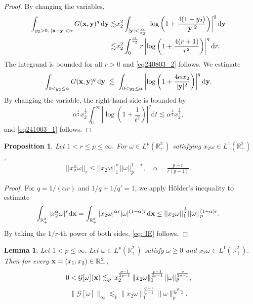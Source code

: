 \documentclass[11pt]{amsart}
\newtheorem{lemma}[theorem]{Lemma}
\newtheorem{proposition}[theorem]{Proposition}
\theoremstyle{definition}
\theoremstyle{definition}
\numberwithin{equation}{section}
\newcommand{\0}{\emptyset}
\newcommand{\bfx}{{\bf x}}
\newcommand{\bfy}{{\bf y}}
\newcommand{\calG}{\mathcal G}
\newcommand{\dd}{\mathrm{d}}
\begin{document}
	\begin{proof}
		By changing the variables,
		\begin{align*}
			\int_{y_2>0,\;|\bfx-\bfy|<\alpha} G(\bfx,\bfy)^q \,\dd\bfy
			\lesssim &x_2^2 \int_{|\bfy|<\frac{\alpha}{x_2}} \left| \log\left(1+\frac{4(1-y_2)}{|\bfy|^2}\right)\right|^q \dd\bfy \\ \lesssim &x_2^2 \int_0^{\frac{\alpha}{x_2}} r \left| \log \left(1+\frac{4(r+1)}{r^2}\right)\right|^q \dd r.
		\end{align*}
		The integrand is bounded for all $r>0$ and \eqref{eq240803_2} follows. We estimate 
		\[
		\int_{0<y_2\le\alpha} G(\bfx,\bfy)^q \,\dd\bfy 
		\;\lesssim\; \int_{0<y_2\le\alpha} \left|\log \left(1+\frac{4\alpha x_2}{|\bfy|^2}\right)\right|^q \dd\bfy.
		\]
		By changing the variable, the right-hand side is bounded by
		\[
		\alpha^{\frac{3}{2}}x_2^{\frac{1}{2}} \int_0^\infty \left|\log\!\left(1+\frac{1}{t^2}\right)\right|^q \dd t \lesssim \alpha^{\frac{3}{2}}x_2^{\frac{1}{2}},
		\]
		and \eqref{eq241003_1} follows. 
	\end{proof}
	
	
	\begin{proposition}\label{prop: IE}
		Let $1<r\leq p\leq \infty$. For $\omega\in L^{p}(\mathbb{R}^{2}_{+})$ satisfying $x_2\omega\in L^{1}(\mathbb{R}^{2}_{+})$,  
		\begin{align}
			||x_2^{\alpha}\omega||_{r}\leq ||x_2\omega||_{1}^{\alpha}||\omega||_{p}^{1-\alpha},\quad \alpha=\frac{p-r}{r(p-1)}.  \label{eq: IE}
		\end{align}
	\end{proposition}
	
	\begin{proof}
		For $q=1/(\alpha r)$ and $1/q+1/q'=1$, we apply H\"older's inequality to estimate 
		\begin{align*}
			\int_{\mathbb{R}^{2}_{+}}|x_2^{\alpha}\omega|^{r}\dd\bfx=\int_{\mathbb{R}^{2}_{+}}|x_2\omega|^{\alpha r}|\omega|^{(1-\alpha) r}\dd\bfx
			\leq ||x_2\omega||_{1}^{\frac{1}{q}}||\omega||_{p}^{(1-\alpha)r}.
		\end{align*}
		By taking the $1/r$-th power of both sides, \eqref{eq: IE} follows.
	\end{proof}
	
	
	\begin{lemma}\label{lem_stream_bdd_2}
		Let $1<p\leq \infty$. Let $\omega\in L^p(\mathbb{R}^2_+)$ satisfy $\omega\geq 0$ and $x_2\omega\in L^1(\mathbb{R}^2_+)$. Then for every $\bfx=(x_1,x_2)\in\mathbb{R}^2_+$,
		\begin{equation}\label{eq_0719_01}
			0< \calG[\omega](\bfx) \lesssim_p \, x_2^{\frac{p-1}{2p-1}} \, \|x_2\omega\|_1^{\frac{p-1}{2p-1}} \, \|\omega\|_p^{\frac{p}{2p-1}},
		\end{equation}
		\begin{equation}\label{eq250718_2}
			\|\calG[\omega]\|_{\infty}\lesssim_p \|x_2\omega\|_{1}^{\frac{2p-2}{3p-2}}\|\omega\|_{p}^{\frac{p}{3p-2}}.
		\end{equation}
	\end{lemma}
	
\end{document}
